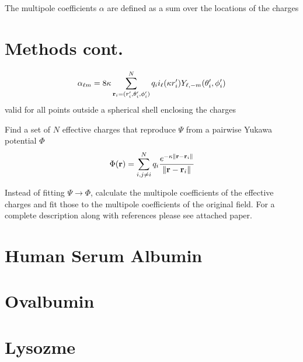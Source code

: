 \documentclass[landscape]{sciposter}
\newcommand{\eqnote}[1]{{\scriptsize#1}}
\begin{document}
\begin{multicols}{3}
The multipole coefficients $\alpha$ are defined as a sum over the locations of the charges
\section*{Methods cont.}
\vspace{-1em}

\begin{equation}
  \label{eq:yukawa_coeff_inv}
  \alpha_{\ell m} = 8 \kappa \sum_{\mathbf{r}_i=(r'_i,\theta'_i,\phi'_i)}^N
  q_i i_\ell(\kappa r'_i) Y_{\ell, -m}(\theta'_i, \phi'_i)
\end{equation}
\eqnote{valid for all points outside a spherical shell enclosing the charges}
\vspace{.1em}

Find a set of $N$ effective charges that reproduce $\Psi$ from a pairwise Yukawa potential $\Phi$
\begin{equation}
  \label{eq:yukawa}
  \Phi(\mathbf{r}) = \sum_{i, j \neq i}^N
  q_i 
  \frac
  {e^{-\kappa \left\Vert  \mathbf{r} - \mathbf{r}_i \right\Vert}}
  {\left\Vert  \mathbf{r} - \mathbf{r}_i \right\Vert}
\end{equation}

Instead of fitting $\Psi \rightarrow \Phi$, calculate the multipole coefficients of the effective charges and fit those to the multipole coefficients of the original field. For a complete description along with references please see attached paper.



% 


%
%

\end{multicols}


\begin{multicols}{3}

  \section*{Human Serum Albumin}

%
\vfill
\columnbreak


\section*{Ovalbumin}
%

%
\vfill
\columnbreak
\section*{Lysozme}
%


%
\vfill
\end{multicols}
\end{document}
